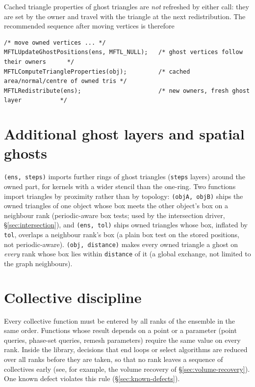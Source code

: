 Cached triangle properties of ghost triangles are \emph{not} refreshed by either call: they are
set by the owner and travel with the triangle at the next redistribution. The recommended
sequence after moving vertices is therefore
\begin{lstlisting}[numbers=none]
/* move owned vertices ... */
MFTLUpdateGhostPositions(ens, MFTL_NULL);   /* ghost vertices follow their owners      */
MFTLComputeTriangleProperties(obj);         /* cached area/normal/centre of owned tris */
MFTLRedistribute(ens);                      /* new owners, fresh ghost layer           */
\end{lstlisting}

\section{Additional ghost layers and spatial ghosts}

\texttt{(ens, steps)} imports further rings of ghost triangles
(\texttt{steps} layers) around the owned part, for kernels with a wider stencil than the one-ring.
Two functions import triangles by proximity rather than by topology:
\texttt{(objA, objB)} ships the owned triangles of one object whose
box meets the other object's box on a neighbour rank (periodic-aware box tests; used by the
intersection driver, \S\ref{sec:intersection}), and
\texttt{(ens, tol)} ships owned triangles whose box, inflated by
\texttt{tol}, overlaps a neighbour rank's box (a plain box test on the stored positions, not
periodic-aware). \texttt{(obj, distance)} makes every owned
triangle a ghost on \emph{every} rank whose box lies within \texttt{distance} of it (a global
exchange, not limited to the graph neighbours).

\section{Collective discipline}

Every collective function must be entered by all ranks of the ensemble in the same order.
Functions whose result depends on a point or a parameter (point queries, phase-set queries,
remesh parameters) require the same value on every rank. Inside the library, decisions that end loops or select algorithms are reduced over all ranks
before they are taken, so that no rank leaves a sequence of collectives early (see, for example,
the volume recovery of \S\ref{sec:volume-recovery}). One known defect violates this rule
(\S\ref{sec:known-defects}).
